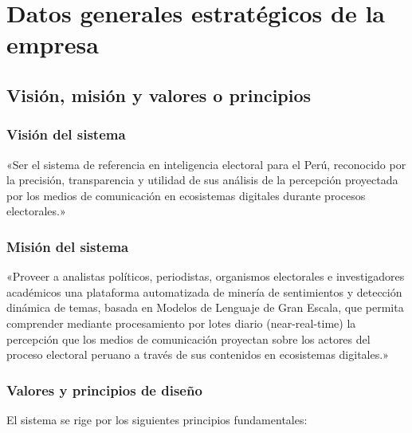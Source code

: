 \section{Datos generales estratégicos de la empresa}

\subsection{Visión, misión y valores o principios}

\subsubsection*{Visión del sistema}

«Ser el sistema de referencia en inteligencia electoral para el Perú, reconocido por la precisión, transparencia y utilidad de sus análisis de la percepción proyectada por los medios de comunicación en ecosistemas digitales durante procesos electorales.»

\subsubsection*{Misión del sistema}

«Proveer a analistas políticos, periodistas, organismos electorales e investigadores académicos una plataforma automatizada de minería de sentimientos y detección dinámica de temas, basada en Modelos de Lenguaje de Gran Escala, que permita comprender mediante procesamiento por lotes diario (near-real-time) la percepción que los medios de comunicación proyectan sobre los actores del proceso electoral peruano a través de sus contenidos en ecosistemas digitales.»

\subsubsection*{Valores y principios de diseño}

El sistema se rige por los siguientes principios fundamentales:

